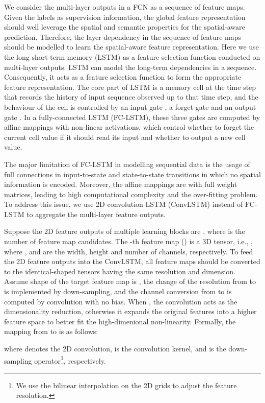 \documentclass[10pt,twocolumn,twoside]{IEEEtran}
\begin{document}
We consider the multi-layer outputs in a FCN as a sequence of feature maps. Given the labels as supervision information, the global feature representation should well leverage the spatial and semantic properties for the spatial-aware prediction. Therefore, the layer dependency in the sequence of feature maps should be modelled to learn the spatial-aware feature representation. Here we use the long short-term memory (LSTM) as a feature selection function conducted on multi-layer outputs. LSTM can model the long-term dependencies in a sequence. Consequently, it acts as a feature selection function to form the appropriate feature representation. The core part of LSTM is a memory cell  at the time step  that records the history of input sequence observed up to that time step, and the behaviour of the cell is controlled by an input gate , a forget gate  and an output gate . In a fully-connected LSTM (FC-LSTM), these three gates are computed by affine mappings with non-linear activations, which control whether to forget the current cell value if it should read its input and whether to output a new cell value.

The major limitation of FC-LSTM in modelling sequential data is the usage of full connections in input-to-state and state-to-state transitions in which no spatial information is encoded. Moreover, the affine mappings are with full weight matrices, leading to high computational complexity and the over-fitting problem. To address this issue, we use 2D convolution LSTM \cite{NIPS15:CONVLSTM} (ConvLSTM) instead of FC-LSTM to aggregate the multi-layer feature outputs. 

Suppose the 2D feature outputs of multiple learning blocks are , where  is the number of feature map candidates. The -th feature map () is a 3D tensor, i.e., , where ,  and  are the width, height and number of channels, respectively. To feed the 2D feature outputs into the ConvLSTM, all feature maps should be converted to the identical-shaped tensors  having the same resolution and dimension. Assume shape of the target feature map is , the change of the resolution from  to  is implemented by down-sampling, and the channel conversion from  to  is computed by  convolution with no bias. When , the  convolution acts as the dimensionality reduction, otherwise it expands the original features into a higher feature space to better fit the high-dimenional non-linearity. Formally, the mapping from  to  is as follows:

where  denotes the 2D convolution,  is the convolution kernel, and  is the down-sampling operator\footnote{We use the bilinear interpolation on the 2D grids to adjust the feature resolution.}, respectively.
\end{document}
